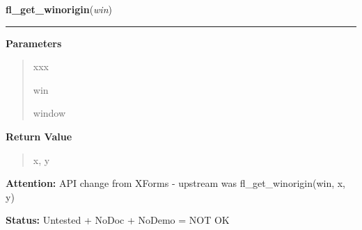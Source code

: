     \label{xformslib:library:fl_get_winorigin}

    \vspace{0.5ex}

\hspace{.8\funcindent}\begin{boxedminipage}{\funcwidth}

    \raggedright \textbf{fl\_get\_winorigin}(\textit{win})

    \vspace{-1.5ex}

    \rule{\textwidth}{0.5\fboxrule}
\setlength{\parskip}{2ex}
\setlength{\parskip}{1ex}
      \textbf{Parameters}
      \vspace{-1ex}

      \begin{quote}
        \begin{Ventry}{xxx}

          \item[win]

          window

        \end{Ventry}

      \end{quote}

      \textbf{Return Value}
    \vspace{-1ex}

      \begin{quote}
      x, y

      \end{quote}

\textbf{Attention:} API change from XForms - upstream was fl\_get\_winorigin(win, x, y)



\textbf{Status:} Untested + NoDoc + NoDemo = NOT OK



    \end{boxedminipage}

    \label{xformslib:library:fl_get_wingeometry}

    \vspace{0.5ex}

